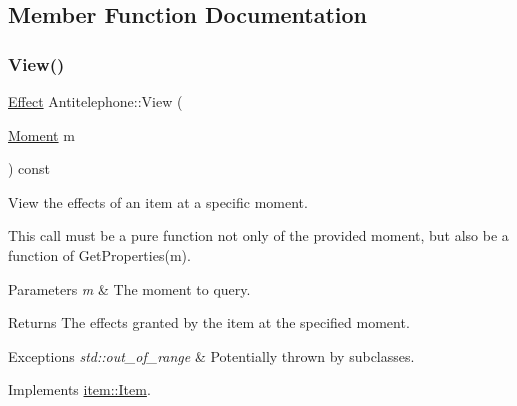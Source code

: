 \subsection{Member Function Documentation}
\mbox{\label{classitem_1_1_antitelephone_ae8f9abbbb65d23970fb3b61393bda141}} 
\subsubsection{\texorpdfstring{View()}{View()}}
{\footnotesize\ttfamily \hyperlink{classitem_1_1_effect}{Effect} Antitelephone\+::\+View (\begin{DoxyParamCaption}\item[{\hyperlink{classtimeplane_1_1_moment}{Moment}}]{m }\end{DoxyParamCaption}) const\hspace{0.3cm}{\ttfamily [virtual]}}



View the effects of an item at a specific moment. 

This call must be a pure function not only of the provided moment, but also be a function of {\ttfamily Get\+Properties(m)}. 
\begin{DoxyParams}{Parameters}
{\em m} & The moment to query. \\
\hline
\end{DoxyParams}
\begin{DoxyReturn}{Returns}
The effects granted by the item at the specified moment. 
\end{DoxyReturn}

\begin{DoxyExceptions}{Exceptions}
{\em std\+::out\+\_\+of\+\_\+range} & Potentially thrown by subclasses. \\
\hline
\end{DoxyExceptions}


Implements \hyperlink{classitem_1_1_item_a7d2b010a27fec55e04a56e7c4fca7837}{item\+::\+Item}.

\mbox{\label{classitem_1_1_antitelephone_afe8ac703b5f19181f221afe07c05cae7}} 
